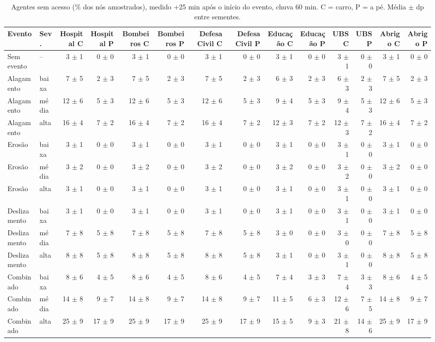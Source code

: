 \begin{table}[htbp]
\centering
\tiny
\caption{Agentes sem acesso (\% dos nós amostrados), medido +25 min após o início do evento, chuva 60 min. C = carro, P = a pé. Média $\pm$ dp entre sementes.}
\label{tab:t4_25min_60}
\begin{tabular}{llrrrrrrrrrrrr}
\toprule
Evento & Sev. & Hospital C & Hospital P & Bombeiros C & Bombeiros P & Defesa Civil C & Defesa Civil P & Educação C & Educação P & UBS C & UBS P & Abrigo C & Abrigo P \\
\midrule
Sem evento & -- & 3 $\pm$ 1 & 0 $\pm$ 0 & 3 $\pm$ 1 & 0 $\pm$ 0 & 3 $\pm$ 1 & 0 $\pm$ 0 & 3 $\pm$ 1 & 0 $\pm$ 0 & 3 $\pm$ 1 & 0 $\pm$ 0 & 3 $\pm$ 1 & 0 $\pm$ 0 \\
Alagamento & baixa & 7 $\pm$ 5 & 2 $\pm$ 3 & 7 $\pm$ 5 & 2 $\pm$ 3 & 7 $\pm$ 5 & 2 $\pm$ 3 & 6 $\pm$ 3 & 2 $\pm$ 3 & 6 $\pm$ 3 & 2 $\pm$ 3 & 7 $\pm$ 5 & 2 $\pm$ 3 \\
Alagamento & média & 12 $\pm$ 6 & 5 $\pm$ 3 & 12 $\pm$ 6 & 5 $\pm$ 3 & 12 $\pm$ 6 & 5 $\pm$ 3 & 9 $\pm$ 4 & 5 $\pm$ 3 & 9 $\pm$ 4 & 5 $\pm$ 3 & 12 $\pm$ 6 & 5 $\pm$ 3 \\
Alagamento & alta & 16 $\pm$ 4 & 7 $\pm$ 2 & 16 $\pm$ 4 & 7 $\pm$ 2 & 16 $\pm$ 4 & 7 $\pm$ 2 & 12 $\pm$ 3 & 7 $\pm$ 2 & 12 $\pm$ 3 & 7 $\pm$ 2 & 16 $\pm$ 4 & 7 $\pm$ 2 \\
Erosão & baixa & 3 $\pm$ 1 & 0 $\pm$ 0 & 3 $\pm$ 1 & 0 $\pm$ 0 & 3 $\pm$ 1 & 0 $\pm$ 0 & 3 $\pm$ 1 & 0 $\pm$ 0 & 3 $\pm$ 1 & 0 $\pm$ 0 & 3 $\pm$ 1 & 0 $\pm$ 0 \\
Erosão & média & 3 $\pm$ 2 & 0 $\pm$ 0 & 3 $\pm$ 2 & 0 $\pm$ 0 & 3 $\pm$ 2 & 0 $\pm$ 0 & 3 $\pm$ 2 & 0 $\pm$ 0 & 3 $\pm$ 2 & 0 $\pm$ 0 & 3 $\pm$ 2 & 0 $\pm$ 0 \\
Erosão & alta & 3 $\pm$ 1 & 0 $\pm$ 0 & 3 $\pm$ 1 & 0 $\pm$ 0 & 3 $\pm$ 1 & 0 $\pm$ 0 & 3 $\pm$ 1 & 0 $\pm$ 0 & 3 $\pm$ 1 & 0 $\pm$ 0 & 3 $\pm$ 1 & 0 $\pm$ 0 \\
Deslizamento & baixa & 3 $\pm$ 1 & 0 $\pm$ 0 & 3 $\pm$ 1 & 0 $\pm$ 0 & 3 $\pm$ 1 & 0 $\pm$ 0 & 3 $\pm$ 1 & 0 $\pm$ 0 & 3 $\pm$ 1 & 0 $\pm$ 0 & 3 $\pm$ 1 & 0 $\pm$ 0 \\
Deslizamento & média & 7 $\pm$ 8 & 5 $\pm$ 8 & 7 $\pm$ 8 & 5 $\pm$ 8 & 7 $\pm$ 8 & 5 $\pm$ 8 & 3 $\pm$ 0 & 0 $\pm$ 0 & 3 $\pm$ 0 & 0 $\pm$ 0 & 7 $\pm$ 8 & 5 $\pm$ 8 \\
Deslizamento & alta & 8 $\pm$ 8 & 5 $\pm$ 8 & 8 $\pm$ 8 & 5 $\pm$ 8 & 8 $\pm$ 8 & 5 $\pm$ 8 & 3 $\pm$ 1 & 0 $\pm$ 0 & 3 $\pm$ 1 & 0 $\pm$ 0 & 8 $\pm$ 8 & 5 $\pm$ 8 \\
Combinado & baixa & 8 $\pm$ 6 & 4 $\pm$ 5 & 8 $\pm$ 6 & 4 $\pm$ 5 & 8 $\pm$ 6 & 4 $\pm$ 5 & 7 $\pm$ 4 & 3 $\pm$ 3 & 7 $\pm$ 4 & 3 $\pm$ 3 & 8 $\pm$ 6 & 4 $\pm$ 5 \\
Combinado & média & 14 $\pm$ 8 & 9 $\pm$ 7 & 14 $\pm$ 8 & 9 $\pm$ 7 & 14 $\pm$ 8 & 9 $\pm$ 7 & 11 $\pm$ 5 & 6 $\pm$ 3 & 12 $\pm$ 6 & 7 $\pm$ 5 & 14 $\pm$ 8 & 9 $\pm$ 7 \\
Combinado & alta & 25 $\pm$ 9 & 17 $\pm$ 9 & 25 $\pm$ 9 & 17 $\pm$ 9 & 25 $\pm$ 9 & 17 $\pm$ 9 & 15 $\pm$ 5 & 9 $\pm$ 3 & 21 $\pm$ 8 & 14 $\pm$ 6 & 25 $\pm$ 9 & 17 $\pm$ 9 \\
\bottomrule
\end{tabular}
\end{table}
